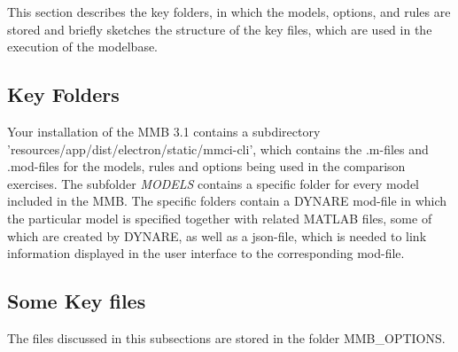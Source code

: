 This section describes the key folders, in which the models, options, and rules are stored and briefly sketches the structure of the key files, which are used in the execution of the modelbase.

\subsection*{Key Folders}
 
Your installation of the MMB 3.1 contains a subdirectory 'resources/app/dist/electron/static/mmci-cli', which contains the .m-files and .mod-files for the models, rules and options being used in the comparison exercises. 
The subfolder \textit{MODELS} contains a specific folder for every model included in the MMB. The specific folders contain a  DYNARE mod-file in which the particular model is specified together with related MATLAB files, some of which are created by DYNARE, as well as a json-file, which is needed to link information displayed in the user interface to the corresponding mod-file. 

\subsection*{Some Key files}
The files discussed in this subsections are stored in the folder MMB\_OPTIONS.

